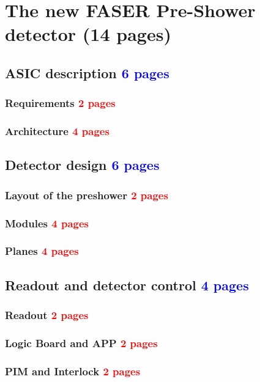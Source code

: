 \chapter{The new FASER Pre-Shower detector (14 pages)}
	\section{ASIC description  \textcolor{blue}{ 6 pages}}
		\subsection{Requirements \textcolor{red}{ 2 pages}}
		\subsection{Architecture \textcolor{red}{ 4 pages}}
		
	\section{Detector design \textcolor{blue}{ 6 pages}}
		\subsection{Layout of the preshower  \textcolor{red}{ 2 pages}}
		\subsection{Modules \textcolor{red}{ 4 pages}}
		\subsection{Planes \textcolor{red}{ 4 pages}}
		
	\section{Readout and detector control  \textcolor{blue}{ 4 pages}}
		\subsection{Readout \textcolor{red}{ 2 pages}}
		\subsection{Logic Board and APP \textcolor{red}{ 2 pages}}
		\subsection{PIM and Interlock \textcolor{red}{ 2 pages}}